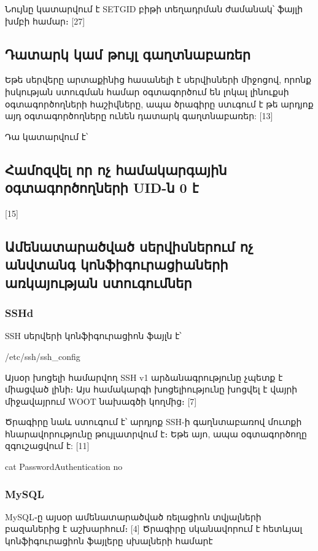 \documentclass[a4paper,12pt]{article}
\begin{document}
\begin{sloppypar}
Նույնը կատարվում է SETGID բիթի տեղադրման ժամանակ՝
ֆայլի խմբի համար։
[27]


\subsection{Դատարկ կամ թույլ գաղտնաբառեր}

Եթե սերվերը արտաքինից հասանելի է սերվիսների միջոցով,
որոնք իսկության ստուգման համար օգտագործում են լոկալ
լինուքսի օգտագործողների հաշիվները, ապա ծրագիրը ստւգում է
թե արդյոք այդ օգտագործողները ունեն դատարկ գաղտնաբառեր: [13]

Դա կատարվում է՝



\subsection{Համոզվել որ ոչ համակարգային օգտագործողների UID-ն 0 է}

[15]


\subsection{Ամենատարածված սերվիսներում ոչ անվտանգ կոնֆիգուրացիաների առկայության ստուգումներ}

\subsubsection{SSHd}

SSH սերվերի կոնֆիգուրացիոն ֆայլն է՝

    /etc/ssh/ssh\_config

Այսօր խոցելի համարվող SSH v1 արձանագրությունը չպետք է միացված լինի։
Այս համակարգի խոցելիությունը խոցվել է վայրի միջավայրում WOOT
նախագծի կողմից։ [7]

Ծրագիրը նաև ստուգում է՝ արդյոք SSH-ի գաղնտաբառով մուտքի
հնարավորությունը թույլատրվում է։ Եթե այո, ապա օգտագործողը
զգուշացվում է: [11]

    cat PasswordAuthentication no

\subsubsection{MySQL}

MySQL֊ը այսօր ամենատարածված ռելացիոն տվյալների բազաներից է աշխարհում։ [4]
Ծրագիրը սկանավորում է հետևյալ կոնֆիգուրացիոն ֆայլերը սխալների համարէ


\end{sloppypar}
\end{document}
